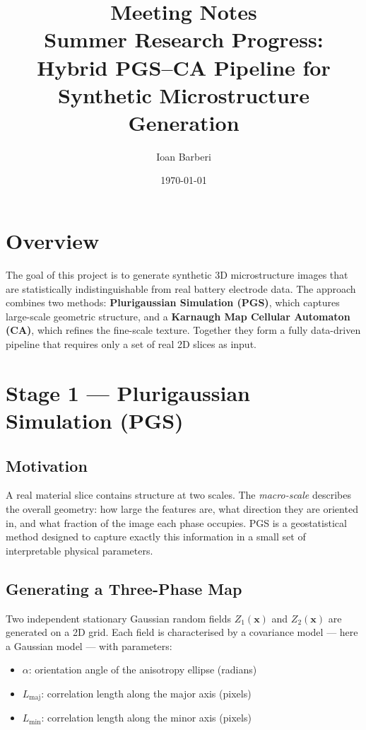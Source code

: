 \documentclass[11pt, a4paper]{article}
\title{\textbf{Meeting Notes} \\ \large Summer Research Progress: Hybrid PGS--CA Pipeline for Synthetic Microstructure Generation}
\author{Ioan Barberi}
\date{\today}
\begin{document}
\maketitle

\section{Overview}

The goal of this project is to generate synthetic 3D microstructure images that are statistically indistinguishable from real battery electrode data. The approach combines two methods: \textbf{Plurigaussian Simulation (PGS)}, which captures large-scale geometric structure, and a \textbf{Karnaugh Map Cellular Automaton (CA)}, which refines the fine-scale texture. Together they form a fully data-driven pipeline that requires only a set of real 2D slices as input.

\section{Stage 1 --- Plurigaussian Simulation (PGS)}

\subsection{Motivation}

A real material slice contains structure at two scales. The \emph{macro-scale} describes the overall geometry: how large the features are, what direction they are oriented in, and what fraction of the image each phase occupies. PGS is a geostatistical method designed to capture exactly this information in a small set of interpretable physical parameters.

\subsection{Generating a Three-Phase Map}

Two independent stationary Gaussian random fields $Z_1(\mathbf{x})$ and $Z_2(\mathbf{x})$ are generated on a 2D grid. Each field is characterised by a covariance model --- here a Gaussian model --- with parameters:
\begin{itemize}
    \item $\alpha$: orientation angle of the anisotropy ellipse (radians)
    \item $L_{\text{maj}}$: correlation length along the major axis (pixels)
    \item $L_{\text{min}}$: correlation length along the minor axis (pixels)
\end{itemize}
\end{document}
